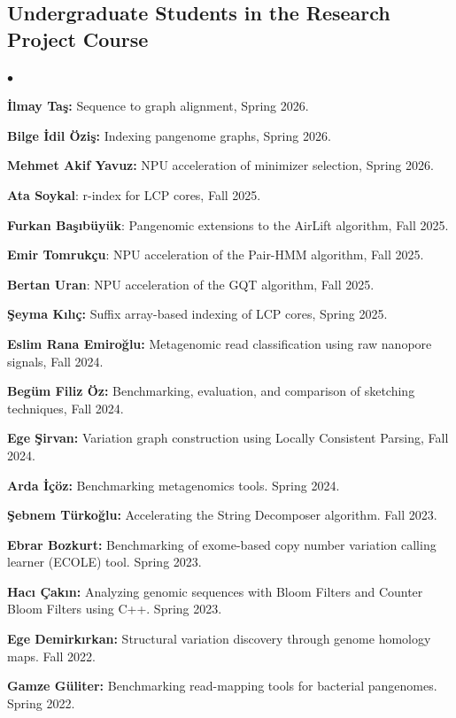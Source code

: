 \documentclass[margin,line]{res}
\newenvironment{list2}{
  \begin{list}{$\bullet$}{%
      \setlength{\itemsep}{0.1cm}
      \setlength{\parsep}{0in} \setlength{\parskip}{0in}
      \setlength{\topsep}{0in} \setlength{\partopsep}{0in} 
      \setlength{\leftmargin}{0.2in}}}{\end{list}}
\begin{document}
\begin{resume}
  \subsection{\small \sc Undergraduate Students in the Research Project Course}
  \begin{list2}
    \item 
        \textbf{İlmay Taş:} Sequence to graph alignment, Spring 2026.
    \item 
        \textbf{Bilge İdil Öziş:} Indexing pangenome graphs, Spring 2026.
    \item 
        \textbf{Mehmet Akif Yavuz:} NPU acceleration of minimizer selection, Spring 2026.
  \item \textbf{Ata Soykal}: r-index for LCP cores, Fall 2025. 
\item \textbf{Furkan Başıbüyük}: Pangenomic extensions to the AirLift algorithm, Fall 2025. 
\item \textbf{Emir Tomrukçu}: NPU acceleration of the Pair-HMM algorithm, Fall 2025. 
\item \textbf{Bertan Uran}: NPU acceleration of the GQT algorithm, Fall 2025. 
  \item \textbf{Şeyma Kılıç:} Suffix array-based indexing of LCP cores, Spring 2025.
  \item \textbf{Eslim Rana Emiroğlu:} Metagenomic read classification using raw nanopore signals, Fall 2024.
 \item \textbf{Begüm Filiz Öz:} Benchmarking, evaluation, and comparison of sketching techniques, Fall 2024.
 \item \textbf{Ege Şirvan:} Variation graph construction using Locally Consistent Parsing, Fall 2024.
\item
    {\bf Arda İçöz:} Benchmarking metagenomics tools. Spring 2024.
\item
    {\bf Şebnem Türkoğlu:} Accelerating the String Decomposer algorithm. Fall 2023.
    \item
    {\bf Ebrar Bozkurt:} Benchmarking of exome-based copy number variation calling learner (ECOLE) tool. Spring 2023.
\item
    {\bf Hacı Çakın:} Analyzing genomic sequences with Bloom
Filters and Counter Bloom Filters using C++. Spring 2023.
   \item \textbf{Ege Demirkırkan:} Structural variation discovery through genome homology maps. Fall 2022.
   \item \textbf{Gamze Güliter:} Benchmarking read-mapping tools for bacterial pangenomes. Spring 2022.
   

\end{list2}
\end{resume}
\end{document}
